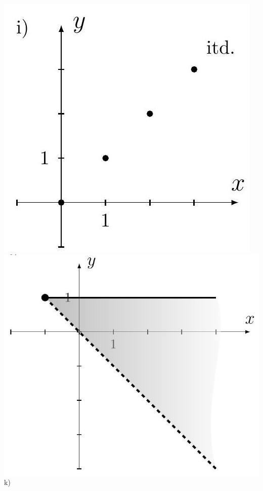 \documentclass[10pt]{article}
\begin{document}
\begin{enumerate}
\includegraphics[max width=\textwidth, center]{2024_11_21_8f01584889ff06348ae7g-069}\\
\includegraphics[max width=\textwidth, center]{2024_11_21_8f01584889ff06348ae7g-069(1)}\\
k)\\

\end{enumerate}
\end{document}
